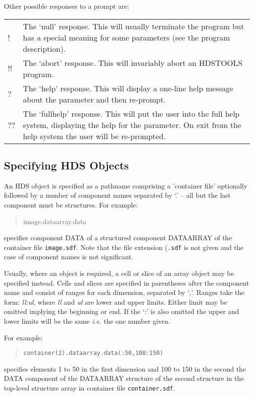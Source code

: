 \documentclass[twoside,11pt]{article}
\renewcommand{\_}{\texttt{\symbol{95}}}
\begin{document}
Other possible responses to a prompt are:\\
\begin{tabular}{p{.25in}p{5.25in}}
! & The `null' response. This will usually terminate the program but has a
special meaning for some parameters (see the program description).\\
!! & The `abort' response. This will invariably abort an HDSTOOLS program.\\
? & The `help' response. This will display a one-line help message about
the parameter and then re-prompt.\\
?? & The `fullhelp' response. This will put the user into the full help
system, displaying the help for the parameter. On exit from the help system
the user will be re-prompted.
\end{tabular}

\subsection{\label{specifying_hds_objects}Specifying HDS Objects}
An HDS object is specified as a pathname comprising a 'container file' 
optionally followed by a number of component names separated by `.' -- all but
the last component must be structures. For example:
\begin{quote}
image.data\_array.data
\end{quote}
specifies component DATA of a structured component DATA\_ARRAY of the
container file \texttt{image.sdf}. Note that the file extension (\texttt{.sdf}
is not given and the case of component names is not significant.

Usually, where an object is required, a cell or slice of an array object may be
specified instead. Cells and slices are specified in parentheses after the
component name and consist of ranges for each dimension, separated by `,'.
Ranges take the form: \textit{ll:ul}, where \textit{ll} and \textit{ul} are
lower and upper limits. Either limit may be omitted implying the beginning or
end. If the `:' is also omitted the upper and lower limits will be the same
\textit{i.e.} the one number given.

For example:
\begin{quote}
\texttt{container(2).data\_array.data(:50,100:150)}
\end{quote}
specifies elements 1 to 50 in the first dimension and 100 to 150 in the second
the DATA component of the DATA\_ARRAY structure of the second structure in the
top-level structure array in container file \texttt{container.sdf}.
\end{document}
